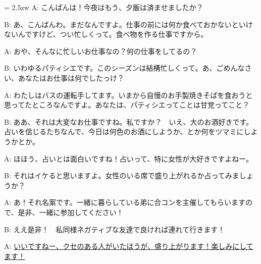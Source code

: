 \documentclass[11pt]{amsart}
\title{}
\author{}
\newenvironment{hangall}[1]{\hangindent = 2.5zw\everypar{\hangindent = 2.5zw}}{}
\begin{document}
\maketitle
\begin{hangall}{}%
A: こんばんは！今夜はもう、夕飯は済ませましたか？

B: あ、こんばんわ。まだなんですよ。仕事の前には何か食べておかないといけないんですけど、つい忙しくって。食べ物を作る仕事ですから。

A: おや、そんなに忙しいお仕事なの？何の仕事をしてるの？

B: いわゆるパティシエです。このシーズンは結構忙しくって。あ、ごめんなさい、あなたはお仕事は何でしたっけ？

A: わたしはバスの運転手してます。いまから自慢のお手製焼きそばを食おうと思ってたところなんですよ。あなたは、パティシエってことは甘党ってこと？

B: ああ、それは大変なお仕事ですね。私ですか？　いえ、大のお酒好きです。占いを信じるたちなんで、今日は何色のお酒にしようか、とか何をツマミにしようかとか。

A: ほほう、占いとは面白いですね！占いって、特に女性が大好きですよねー。

B: それはイケると思いますよ。女性のいる席で盛り上がれるか占ってみましょうか？

A: あ！それ名案です。一緒に暮らしている弟に合コンを主催してもらいますので、是非、一緒に参加してください！

B: ええ是非！　私同様ネガティブな友達で良ければ連れて行きます！

A: \ul{いいですねー、クセのある人がいたほうが、盛り上がります！楽しみにしてます！}\end{hangall}
\end{document}
